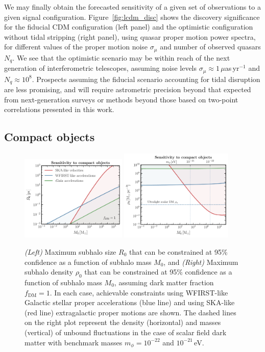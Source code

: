 \documentclass[prd,aps,twocolumn,nofootinbib,superscriptaddress,preprintnumbers,balancelastpage,longbibliography,floatfix]{revtex4-1}
\begin{document}
We may finally obtain the forecasted sensitivity of a given set of observations to a given signal configuration. Figure~\ref{fig:lcdm_disc} shows the discovery significance for the fiducial CDM configuration (left panel) and the optimistic configuration without tidal stripping (right panel), using quasar proper motion power spectra, for different values of the proper motion noise $\sigma_\mu$ and number of observed quasars $N_q$. We see that the optimistic scenario may be within reach of the next generation of interferometric telescopes, assuming noise levels $\sigma_\mu\approx 1\,\mu$as\,yr$^{-1}$ and $N_q\approx10^8$. Prospects assuming the fiducial scenario accounting for tidal disruption are less promising, and will require astrometric precision beyond that expected from next-generation surveys or methods beyond those based on two-point correlations presented in this work.

\subsection{Compact objects}
\label{sec:compact}

\begin{figure}[htbp]
\centering
\includegraphics[width=0.45\textwidth]{plots/compact_M_vs_R.pdf}
\includegraphics[width=0.48\textwidth]{plots/compact_M_vs_rho.pdf}
\caption{\emph{(Left)} Maximum subhalo size $R_0$ that can be constrained at 95\% confidence as a function of subhalo mass $M_0$, and \emph{(Right)} Maximum subhalo density $\rho_0$ that can be constrained at 95\% confidence as a function of subhalo mass $M_0$, assuming dark matter fraction $f_\mathrm{DM}=1$. In each case, achievable constraints using WFIRST-like Galactic stellar proper accelerations (blue line) and using SKA-like (red line) extragalactic proper motions are shown. The dashed lines on the right plot represent the density (horizontal) and masses (vertical) of unbound fluctuations in the case of scalar field dark matter with benchmark masses $m_\phi = 10^{-22}$ and $10^{-21}$\,eV. } 
\label{fig:compact_sens}
\end{figure}
\end{document}
